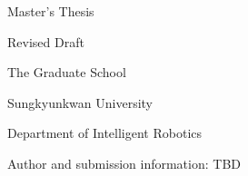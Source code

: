 
\begin{titlepage}
\centering
{\large Master's Thesis\par}
\vspace{1.2cm}
{\fontsize{17.28}{23}\selectfont\bfseries\thesistitle\par}
\vspace{0.9cm}
{\large\thesistitlekr\par}
\vspace{1.3cm}
{\large Revised Draft\par}
\vfill
{\large The Graduate School\par}
\vspace{0.2cm}
{\Large Sungkyunkwan University\par}
\vspace{0.2cm}
{\large Department of Intelligent Robotics\par}
\vspace{1cm}
{\small Author and submission information: TBD\par}
\end{titlepage}
